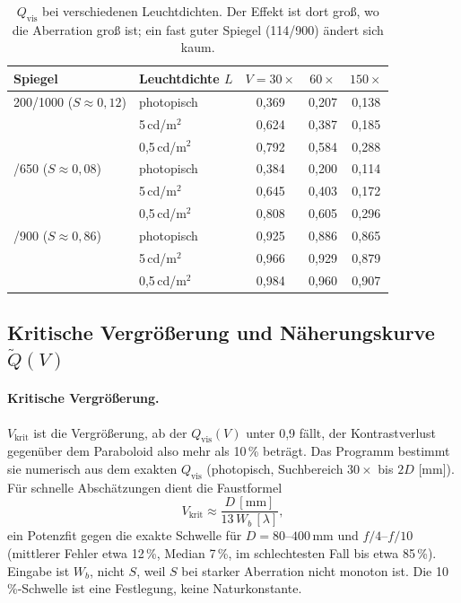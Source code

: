 \documentclass[11pt,a4paper]{article}
\newcommand{\Qvis}{Q_{\mathrm{vis}}}
\newcommand{\Vkrit}{V_{\mathrm{krit}}}
\begin{document}
\begin{table}[ht]
\centering
\begin{tabular}{llccc}
\toprule
Spiegel & Leuchtdichte $L$ & $V=30\times$ & $60\times$ & $150\times$\\
\midrule
200/1000 ($S\approx0{,}12$) & photopisch & 0,369 & 0,207 & 0,138\\
 & 5\,cd/m$^2$ & 0,624 & 0,387 & 0,185\\
 & 0,5\,cd/m$^2$ & 0,792 & 0,584 & 0,288\\
\addlinespace
130/650 ($S\approx0{,}08$) & photopisch & 0,384 & 0,200 & 0,114\\
 & 5\,cd/m$^2$ & 0,645 & 0,403 & 0,172\\
 & 0,5\,cd/m$^2$ & 0,808 & 0,605 & 0,296\\
\addlinespace
114/900 ($S\approx0{,}86$) & photopisch & 0,925 & 0,886 & 0,865\\
 & 5\,cd/m$^2$ & 0,966 & 0,929 & 0,879\\
 & 0,5\,cd/m$^2$ & 0,984 & 0,960 & 0,907\\
\bottomrule
\end{tabular}
\caption{$\Qvis$ bei verschiedenen Leuchtdichten. Der Effekt ist dort groß, wo die Aberration groß ist; ein fast guter Spiegel (114/900) ändert sich kaum.}
\end{table}

\subsection{Kritische Vergrößerung und Näherungskurve \texorpdfstring{$\tilde Q(V)$}{Q(V)}}
\paragraph{Kritische Vergrößerung.} $\Vkrit$ ist die Vergrößerung, ab der $\Qvis(V)$ unter 0,9 fällt, der Kontrastverlust gegenüber dem Paraboloid also mehr als 10\,\% beträgt. Das Programm bestimmt sie numerisch aus dem exakten $\Qvis$ (photopisch, Suchbereich $30\times$ bis $2D$ [mm]). Für schnelle Abschätzungen dient die Faustformel
\begin{equation}
\Vkrit\approx\frac{D\,[\mathrm{mm}]}{13\,W_b\,[\lambda]},
\end{equation}
ein Potenzfit gegen die exakte Schwelle für $D=80$--$400$\,mm und $f/4$--$f/10$ (mittlerer Fehler etwa 12\,\%, Median 7\,\%, im schlechtesten Fall bis etwa 85\,\%). Eingabe ist $W_b$, nicht $S$, weil $S$ bei starker Aberration nicht monoton ist. Die 10\,\%-Schwelle ist eine Festlegung, keine Naturkonstante.
\end{document}
